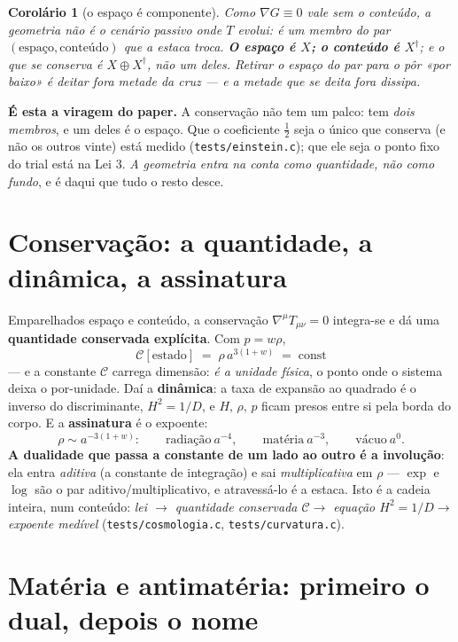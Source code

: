 \documentclass[11pt,a4paper]{article}
\newcommand{\code}[1]{\texttt{\small #1}}
\newtheorem{corolario}[teorema]{Corolário}
\newcommand{\dg}{^{\dagger}}
\begin{document}
\begin{corolario}[o espaço é componente]\label{cor:componente}
Como $\nabla G\equiv0$ vale \emph{sem} o conteúdo, a geometria não é o cenário passivo onde $T$ evolui: é
um membro do par $(\text{espaço},\text{conteúdo})$ que a estaca troca. \textbf{O espaço é $X$; o conteúdo é
$X\dg$}; e o que se conserva é $X\oplus X\dg$, não um deles. Retirar o espaço do par para o pôr «por baixo»
é deitar fora metade da cruz --- e a metade que se deita fora dissipa.
\end{corolario}

\noindent \textbf{É esta a viragem do paper.} A conservação não tem um palco: tem \emph{dois membros}, e um
deles é o espaço. Que o coeficiente $\tfrac12$ seja o único que conserva (e não os outros vinte) está
medido (\code{tests/einstein.c}); que ele seja o ponto fixo do trial está na Lei 3. \emph{A geometria entra
na conta como quantidade, não como fundo}, e é daqui que tudo o resto desce.

\section{Conservação: a quantidade, a dinâmica, a assinatura}\label{sec:conserva}

Emparelhados espaço e conteúdo, a conservação $\nabla^{\mu}T_{\mu\nu}=0$ integra-se e dá uma \textbf{quantidade
conservada explícita}. Com $p=w\rho$,
\[
  \boxed{\;\mathcal C[\text{estado}]\;=\;\rho\,a^{3(1+w)}\;=\;\text{const}\;}
\]
--- e a constante $\mathcal C$ carrega dimensão: \emph{é a unidade física}, o ponto onde o sistema deixa o
por-unidade. Daí a \textbf{dinâmica}: a taxa de expansão ao quadrado é o inverso do discriminante,
$H^2=1/D$, e $H,\,\rho,\,p$ ficam presos entre si pela borda do corpo. E a \textbf{assinatura} é o
expoente:
\[
  \rho\sim a^{-3(1+w)}:\qquad
  \text{radiação}\ a^{-4},\qquad \text{matéria}\ a^{-3},\qquad \text{vácuo}\ a^{0}.
\]
\textbf{A dualidade que passa a constante de um lado ao outro é a involução}: ela entra \emph{aditiva} (a
constante de integração) e sai \emph{multiplicativa} em $\rho$ --- $\exp$ e $\log$ são o par
aditivo/multiplicativo, e atravessá-lo é a estaca. Isto é a cadeia inteira, num conteúdo:
\emph{lei $\to$ quantidade conservada $\mathcal C\to$ equação $H^2=1/D\to$ expoente medível}
(\code{tests/cosmologia.c}, \code{tests/curvatura.c}).

\section{Matéria e antimatéria: primeiro o dual, depois o nome}\label{sec:anti}
\end{document}
